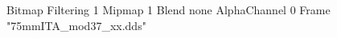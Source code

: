 {Bitmap
	{Filtering 1}
	{Mipmap 1}
	{Blend none}
	{AlphaChannel 0}
	{Frame "75mmITA_mod37_xx.dds"}
}
